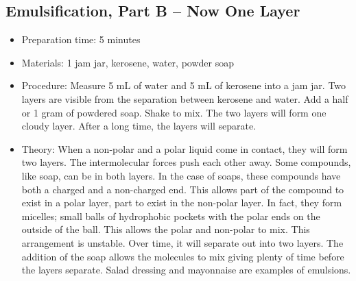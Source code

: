 \subsection{Emulsification, Part B – Now One Layer}
\begin{itemize}
\item{Preparation time: 5 minutes}
\item{Materials: 1 jam jar, kerosene, water, powder soap}
\item{Procedure: Measure 5 mL of water and 5 mL of kerosene into a jam jar. Two layers are visible from the separation between kerosene and water. Add a half or 1 gram of powdered soap. Shake to mix. The two layers will form one cloudy layer. After a long time, the layers will separate.}
\item{Theory: When a non-polar and a polar liquid come in contact, they will form two layers. The intermolecular forces push each other away. Some compounds, like soap, can be in both layers. In the case of soaps, these compounds have both a charged and a non-charged end. This allows part of the compound to exist in a polar layer, part to exist in the non-polar layer. In fact, they form micelles; small balls of hydrophobic pockets with the polar ends on the outside of the ball. This allows the polar and non-polar to mix. This arrangement is unstable. Over time, it will separate out into two layers. The addition of the soap allows the molecules to mix giving plenty of time before the layers separate. Salad dressing and mayonnaise are examples of emulsions.}
\end{itemize}

